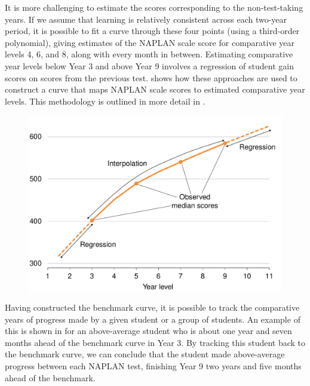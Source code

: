 It is more challenging to estimate the scores corresponding to the non-test-taking years. If we assume that learning is relatively consistent across each two-year period, it is possible to fit a curve through these four points (using a third-order polynomial), giving estimates of the NAPLAN scale score for comparative year levels 4, 6, and 8, along with every month in between. Estimating comparative year levels below Year 3 and above Year 9 involves a regression of student gain scores on scores from the previous test.  shows how these approaches are used to construct a curve that maps NAPLAN scale scores to estimated comparative year levels. This methodology is outlined in more detail in .

\begin{figure}[t]
 \includegraphics[width=\columnwidth]{atlas/CYL_n.pdf}\label{fig:cyl_n}

\end{figure}

\newpage
Having constructed the benchmark curve, it is possible to track the comparative years of progress made by a given student or a group of students. An example of this is shown in  for an above-average student who is about one year and seven months ahead of the benchmark curve in Year 3. By tracking this student back to the benchmark curve, we can conclude that the student made above-average progress between each NAPLAN test, finishing Year 9 two years and five months ahead of the benchmark.

